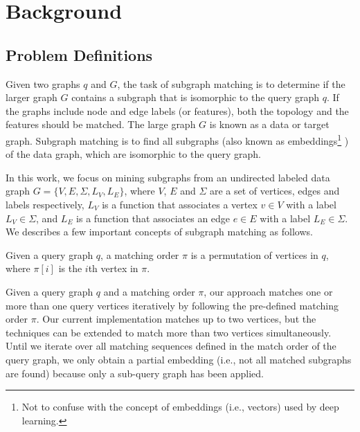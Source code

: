 \section{Background}
\subsection{Problem Definitions}
Given two graphs $q$ and $G$, the task of subgraph matching is to determine if the larger graph $G$ contains a subgraph that is isomorphic
to the query graph $q$. If the graphs include node and edge labels (or features), both the topology and the features should be matched. The
large graph $G$ is known as a data or target graph.  Subgraph matching is to find all subgraphs (also known as embeddings\footnote{Not to
confuse with the concept of embeddings (i.e., vectors) used by deep learning.} ) of the data graph, which are isomorphic to the query
graph.

In this work, we focus on mining subgraphs from an undirected labeled data graph $G=\{V,E,\Sigma,L_V,L_E\}$, where $V$, $E$ and $\Sigma$
are a set of vertices, edges and labels respectively,  $L_V$ is a function that associates a vertex $v \in V$ with a label $L_V \in
\Sigma$, and $L_E$ is a function that associates an edge $e \in E$ with a label $L_E \in \Sigma$. We describes a few important concepts of
subgraph matching as follows.



 Given a query graph $q$, a matching order $\pi$ is a permutation of vertices in $q$, where $\pi[i]$ is the
$i$th vertex in $\pi$.

 Given a query graph $q$ and a matching order $\pi$, our approach matches one or more than one query
vertices iteratively by following the pre-defined matching order $\pi$. Our current implementation matches up to two vertices, but the
techniques can be extended to match more than two vertices simultaneously. Until we iterate over all matching sequences defined in the
match order of the query graph, we only obtain a partial embedding (i.e., not all matched subgraphs are found) because only a sub-query
graph has been applied.

